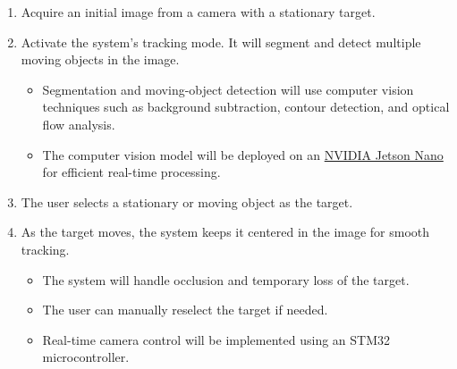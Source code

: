 \documentclass{article}
\begin{document}
\begin{enumerate}
  \item Acquire an initial image from a camera with a stationary target.
  \item Activate the system's tracking mode. It will segment and detect multiple moving
        objects in the image.
        \begin{itemize}
        \item Segmentation and moving-object detection will use computer vision techniques
            such as background subtraction, contour detection, and optical flow analysis.
        \item The computer vision model will be deployed on an 
            \href{https://developer.nvidia.com/embedded/jetson-nano-developer-kit}{NVIDIA Jetson Nano}
            for efficient real-time processing.

        \end{itemize}
  \item The user selects a stationary or moving object as the target.
  \item As the target moves, the system keeps it centered in the image for smooth
        tracking.
        \begin{itemize}
          \item The system will handle occlusion and temporary loss of the target.
          \item The user can manually reselect the target if needed.
          \item Real-time camera control will be implemented using an STM32 microcontroller.
        \end{itemize}
\end{enumerate}
\end{document}
